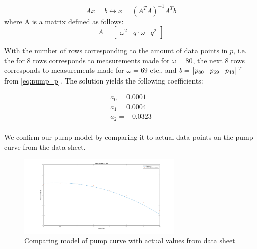 \begin{equation}
	Ax = b \leftrightarrow x = (A^TA)^{-1}A^Tb
\end{equation}
where A is a matrix defined as follows:
\begin{equation}
	A = \begin{bmatrix}
			\omega^2 & q \cdot \omega & q^2
			\end{bmatrix}
\end{equation}

With the number of rows corresponding to the amount of data points in $ p $, i.e. the for 8 rows corresponds to measurements made for $ \omega = 80$, the next 8 rows corresponds to measurements made for $ \omega = 69 $ etc., and $ b = \begin{bmatrix}
	p_{80} \hspace{0.3cm} p_{69} \hspace{0.3cm} p_{48} \end{bmatrix} $$ ^T $ from \cref{eq:pump_p}. The solution yields the following coefficients:

\begin{equation}
	\begin{split}
		a_0 = 0.0001 \\
		a_1 = 0.0004 \\
		a_2 = -0.0323 \\
	\end{split}
\end{equation}

We confirm our pump model by comparing it to actual data points on the pump curve from the data sheet.
\begin{figure}[h!]
	\centering
	\includegraphics[width=0.7\textwidth]{Pictures/Pumpcurve_69.png}
	\caption{Comparing model of pump curve with actual values from data sheet}
	\label{fig:Pumpcurve_69}
\end{figure}








